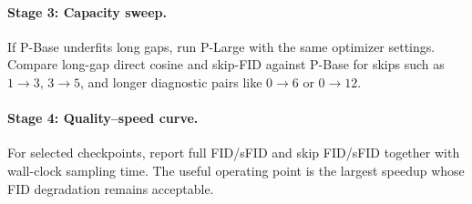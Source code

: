 \documentclass[11pt]{article}
\begin{document}
\paragraph{Stage 3: Capacity sweep.}
If P-Base underfits long gaps, run P-Large with the same optimizer settings.
Compare long-gap direct cosine and skip-FID against P-Base for skips such as
$1\rightarrow3$, $3\rightarrow5$, and longer diagnostic pairs like
$0\rightarrow6$ or $0\rightarrow12$.

\paragraph{Stage 4: Quality--speed curve.}
For selected checkpoints, report full FID/sFID and skip FID/sFID together
with wall-clock sampling time. The useful operating point is the largest
speedup whose FID degradation remains acceptable.
\end{document}
